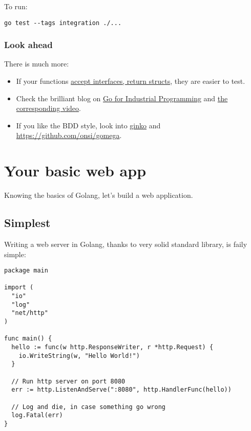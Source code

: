 \documentclass[11pt, letterpaper]{article}
\begin{document}
To run:

\begin{verbatim}
go test --tags integration ./...
\end{verbatim}

\subsubsection{Look ahead}
There is much more:

\begin{itemize}
\item If your functions \href{https://blog.chewxy.com/2018/03/18/golang-interfaces/}{accept interfaces, return structs}, they are easier to test.
\item Check the brilliant blog on \href{https://peter.bourgon.org/go-for-industrial-programming/}{Go for Industrial Programming} and \href{https://www.youtube.com/watch?v=PTE4VJIdHPg}{the corresponding video}.
\item If you like the BDD style, look into \href{https://github.com/onsi/ginkgo}{ginko} and \href{gomega}{https://github.com/onsi/gomega}.
\end{itemize}

\pagebreak
\section{Your basic web app}

Knowing the basics of Golang, let's build a web application.

\subsection{Simplest}

Writing a web server in Golang, thanks to very solid standard library, is faily simple:

\begin{verbatim}
package main

import (
  "io"
  "log"
  "net/http"
)

func main() {
  hello := func(w http.ResponseWriter, r *http.Request) {
    io.WriteString(w, "Hello World!")
  }

  // Run http server on port 8080
  err := http.ListenAndServe(":8080", http.HandlerFunc(hello))

  // Log and die, in case something go wrong
  log.Fatal(err)
}
\end{verbatim}
\end{document}
